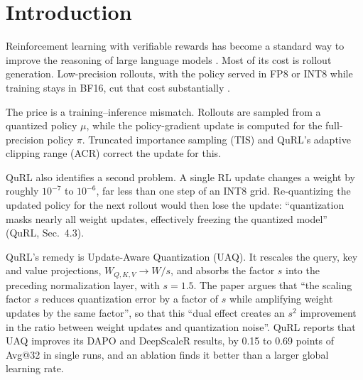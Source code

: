 \section{Introduction}\label{sec:intro}

Reinforcement learning with verifiable rewards has become a standard way to improve the reasoning of large language models \citep{shao2024deepseekmath,yu2025dapo}. Most of its cost is rollout generation. Low-precision rollouts, with the policy served in FP8 or INT8 while training stays in BF16, cut that cost substantially \citep{yao2025flashrl,li2026qurl,huang2025qerl,xi2026jetrl,qiu2026fp8rl}.

The price is a training--inference mismatch. Rollouts are sampled from a quantized policy $\mu$, while the policy-gradient update is computed for the full-precision policy $\pi$. Truncated importance sampling (TIS) \citep{ionides2008truncated,yao2025flashrl} and QuRL's adaptive clipping range (ACR) \citep{li2026qurl} correct the update for this.

QuRL also identifies a second problem. A single RL update changes a weight by roughly $10^{-7}$ to $10^{-6}$, far less than one step of an INT8 grid. Re-quantizing the updated policy for the next rollout would then lose the update: ``quantization masks nearly all weight updates, effectively freezing the quantized model'' (QuRL, Sec.~4.3).

QuRL's remedy is Update-Aware Quantization (UAQ). It rescales the query, key and value projections, $W_{Q,K,V}\to W/s$, and absorbs the factor $s$ into the preceding normalization layer, with $s=1.5$. The paper argues that ``the scaling factor $s$ reduces quantization error by a factor of $s$ while amplifying weight updates by the same factor'', so that this ``dual effect creates an $s^2$ improvement in the ratio between weight updates and quantization noise''. QuRL reports that UAQ improves its DAPO and DeepScaleR results, by 0.15 to 0.69 points of Avg@32 in single runs, and an ablation finds it better than a larger global learning rate.

